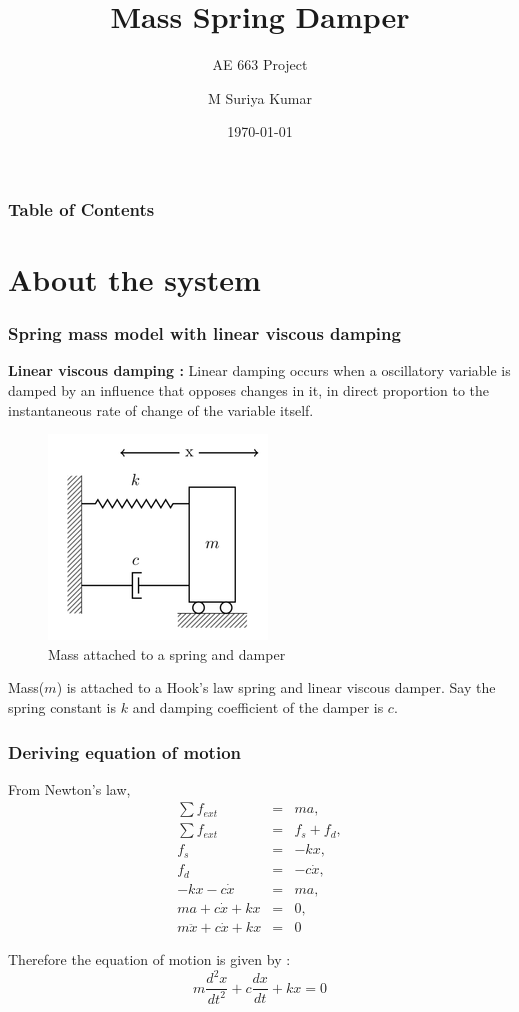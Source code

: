 \documentclass[10pt]{beamer}
\title{Mass Spring Damper}
\subtitle{AE 663 Project}
\institute{Indian Institute of Technology Bombay}
\author{M Suriya Kumar}
\date{\today}
\begin{document}
\begin{frame}[plain]
\maketitle
\end{frame}

\begin{frame}
\frametitle{Table of Contents}
\tableofcontents 
\end{frame}

\section{About the system}

\begin{frame}
\frametitle{Spring mass model with linear viscous damping}
\textbf{Linear viscous damping :} Linear damping occurs when a oscillatory variable is damped 
by an influence that opposes changes in it, in direct proportion to the instantaneous rate of change 
of the variable itself.

\begin{figure}[h]
\includegraphics[scale=0.5]{spring_mass_damper.png}
\caption{Mass attached to a spring and damper}
\centering
\end{figure}

Mass($m$) is attached to a Hook's law spring and linear viscous damper. Say the spring constant 
is $k$ and damping coefficient of the damper is $c$.
\end{frame}

\begin{frame}
\frametitle{Deriving equation of motion}
From Newton's law, 
\begin{eqnarray*}
\sum f_{ext} &=& ma, \\
\sum f_{ext} &=& f_s + f_d, \\
f_s &=& -kx, 	\\
f_d &=& -c\dot{x}, \\
-kx - c\dot{x} &=& ma, \\
ma + c\dot{x} + kx &=& 0, \\
m\ddot{x} + c\dot{x} + kx &=& 0
\end{eqnarray*}

Therefore the equation of motion is given by :
\begin{equation}
m\frac{d^2x}{dt^2} + c\frac{dx}{dt} + kx = 0
\label{eom}
\end{equation}
\end{frame}
\end{document}
